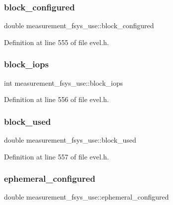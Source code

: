 \subsubsection{\texorpdfstring{block\+\_\+configured}{block\_configured}}
{\footnotesize\ttfamily double measurement\+\_\+fsys\+\_\+use\+::block\+\_\+configured}



Definition at line 555 of file evel.\+h.

\hypertarget{structmeasurement__fsys__use_ab41ba374abdbd41b71a029e4be061a24}{}\label{structmeasurement__fsys__use_ab41ba374abdbd41b71a029e4be061a24} 
\subsubsection{\texorpdfstring{block\+\_\+iops}{block\_iops}}
{\footnotesize\ttfamily int measurement\+\_\+fsys\+\_\+use\+::block\+\_\+iops}



Definition at line 556 of file evel.\+h.

\hypertarget{structmeasurement__fsys__use_ad156e14eb4f7f3ab929e4b709aa1ebea}{}\label{structmeasurement__fsys__use_ad156e14eb4f7f3ab929e4b709aa1ebea} 
\subsubsection{\texorpdfstring{block\+\_\+used}{block\_used}}
{\footnotesize\ttfamily double measurement\+\_\+fsys\+\_\+use\+::block\+\_\+used}



Definition at line 557 of file evel.\+h.

\hypertarget{structmeasurement__fsys__use_a6cc01785b8eb12d616454fb7070ccaa0}{}\label{structmeasurement__fsys__use_a6cc01785b8eb12d616454fb7070ccaa0} 
\subsubsection{\texorpdfstring{ephemeral\+\_\+configured}{ephemeral\_configured}}
{\footnotesize\ttfamily double measurement\+\_\+fsys\+\_\+use\+::ephemeral\+\_\+configured}



